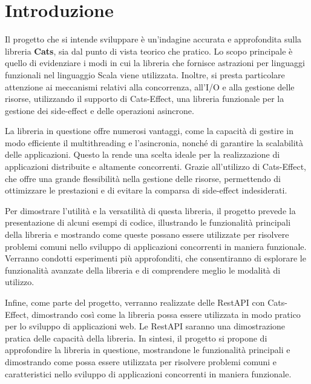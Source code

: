 \chapter{Introduzione}

Il progetto che si intende sviluppare è un'indagine accurata e approfondita sulla libreria \textbf{Cats}, sia dal punto di vista teorico che pratico. Lo scopo principale è quello di evidenziare i modi in cui la libreria che fornisce astrazioni per linguaggi funzionali nel linguaggio Scala viene utilizzata. Inoltre, si presta particolare attenzione ai meccanismi relativi alla concorrenza, all'I/O e alla gestione delle risorse, utilizzando il supporto di Cats-Effect, una libreria funzionale per la gestione dei side-effect e delle operazioni asincrone.

La libreria in questione offre numerosi vantaggi, come la capacità di gestire in modo efficiente il multithreading e l'asincronia, nonché di garantire la scalabilità delle applicazioni. Questo la rende una scelta ideale per la realizzazione di applicazioni distribuite e altamente concorrenti. Grazie all'utilizzo di Cats-Effect, che offre una grande flessibilità nella gestione delle risorse, permettendo di ottimizzare le prestazioni e di evitare la comparsa di side-effect indesiderati.

Per dimostrare l'utilità e la versatilità di questa libreria, il progetto prevede la presentazione di alcuni esempi di codice, illustrando le funzionalità principali della libreria e mostrando come queste possano essere utilizzate per risolvere problemi comuni nello sviluppo di applicazioni concorrenti in maniera funzionale. Verranno condotti esperimenti più approfonditi, che consentiranno di esplorare le funzionalità avanzate della libreria e di comprendere meglio le modalità di utilizzo.

Infine, come parte del progetto, verranno realizzate delle RestAPI con Cats-Effect, dimostrando così come la libreria possa essere utilizzata in modo pratico per lo sviluppo di applicazioni web. Le RestAPI saranno una dimostrazione pratica delle capacità della libreria. In sintesi, il progetto si propone di approfondire la libreria in questione, mostrandone le funzionalità principali e dimostrando come possa essere utilizzata per risolvere problemi comuni e caratteristici nello sviluppo di applicazioni concorrenti in maniera funzionale.